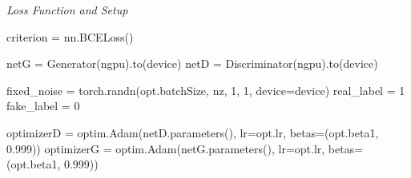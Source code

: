 \documentclass{article}
\begin{document}
\begin{minipage}{\textwidth}
\vspace{8pt}
\emph{Loss Function and Setup}
\vspace{8pt}
\begin{ipythonnb}
criterion = nn.BCELoss()

netG = Generator(ngpu).to(device)
netD = Discriminator(ngpu).to(device)

fixed_noise = torch.randn(opt.batchSize, nz, 1, 1, device=device)
real_label = 1
fake_label = 0

optimizerD = optim.Adam(netD.parameters(), lr=opt.lr, betas=(opt.beta1, 0.999))
optimizerG = optim.Adam(netG.parameters(), lr=opt.lr, betas=(opt.beta1, 0.999))
\end{ipythonnb}
\end{minipage}
\end{document}
